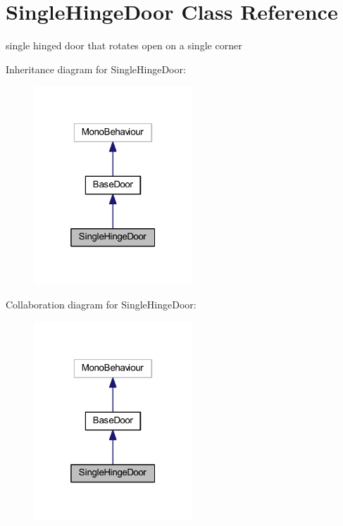 \hypertarget{class_single_hinge_door}{}\section{Single\+Hinge\+Door Class Reference}
\label{class_single_hinge_door}


single hinged door that rotates open on a single corner  




Inheritance diagram for Single\+Hinge\+Door\+:
\nopagebreak
\begin{figure}[H]
\begin{center}
\leavevmode
\includegraphics[width=169pt]{class_single_hinge_door__inherit__graph}
\end{center}
\end{figure}


Collaboration diagram for Single\+Hinge\+Door\+:
\nopagebreak
\begin{figure}[H]
\begin{center}
\leavevmode
\includegraphics[width=169pt]{class_single_hinge_door__coll__graph}
\end{center}
\end{figure}
